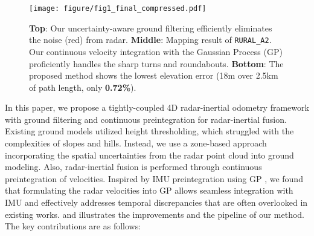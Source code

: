 
\begin{figure}[!t]
    \centering
    \texttt{[image: figure/fig1\_final\_compressed.pdf]}
    \caption{
        \textbf{Top}: Our uncertainty-aware ground filtering efficiently eliminates the noise (red) from radar.
        \textbf{Middle}: Mapping result of \texttt{RURAL\_A2}. Our continuous velocity integration with the Gaussian Process (GP) proficiently handles the sharp turns and roundabouts.
        \textbf{Bottom}: The proposed method shows the lowest elevation error (18m over 2.5km of path length, only \textbf{0.72\%}).
    }
    \label{fig:overview}
    \vspace{-8mm}
\end{figure}


In this paper, we propose a tightly-coupled 4D radar-inertial odometry framework with ground filtering and continuous preintegration for radar-inertial fusion. Existing ground models utilized height thresholding, which struggled with the complexities of slopes and hills. Instead, we use a zone-based approach incorporating the spatial uncertainties from the radar point cloud into ground modeling.
Also, radar-inertial fusion is performed through continuous preintegration of velocities.
Inspired by \ac{IMU} preintegration using \ac{GP} \cite{le2021continuous}, we found that formulating the radar velocities into \ac{GP} allows seamless integration with \ac{IMU} and effectively addresses temporal discrepancies that are often overlooked in existing works.
 and  illustrates the improvements and the pipeline of our method.
The key contributions are as follows:

